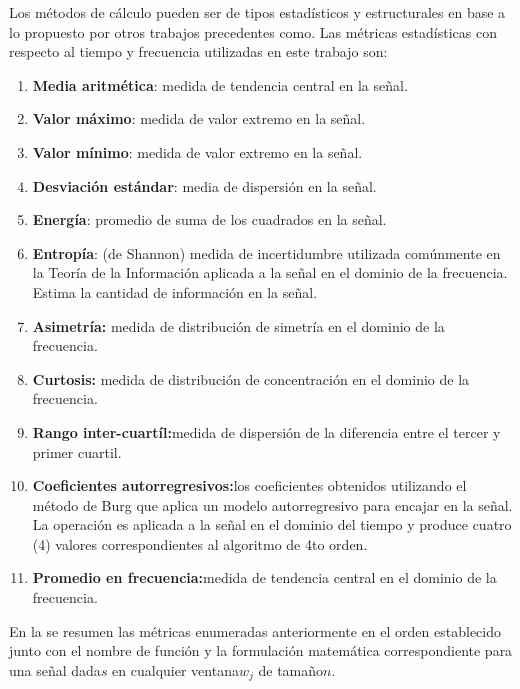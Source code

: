 Los métodos de cálculo pueden ser de tipos estadísticos y estructurales
\cite{LaraLabrador2013} en base a lo propuesto por otros trabajos
precedentes como\cite{Yang2009,Bao2004}. Las métricas estadísticas
con respecto al tiempo y frecuencia utilizadas en este trabajo son:
\begin{enumerate}
\item \textbf{Media aritmética}: medida de tendencia central en la señal.
\item \textbf{Valor máximo}: medida de valor extremo en la señal.
\item \textbf{Valor mínimo}: medida de valor extremo en la señal.
\item \textbf{Desviación estándar}: media de dispersión en la señal.
\item \textbf{Energía}: promedio de suma de los cuadrados en la señal.
\item \textbf{Entropía}: (de Shannon) medida de incertidumbre utilizada
comúnmente en la Teoría de la Información aplicada a la señal en el
dominio de la frecuencia. Estima la cantidad de información en la
señal.
\item \textbf{Asimetría:} medida de distribución de simetría en el dominio
de la frecuencia.
\item \textbf{Curtosis:} medida de distribución de concentración en el dominio
de la frecuencia.
\item \textbf{Rango inter-cuartíl:}medida de dispersión de la diferencia
entre el tercer y primer cuartil.
\item \textbf{Coeficientes autorregresivos:}los coeficientes obtenidos utilizando
el método de Burg que aplica un modelo autorregresivo para encajar
en la señal. La operación es aplicada a la señal en el dominio del
tiempo y produce cuatro (4) valores correspondientes al algoritmo
de 4to orden.
\item \textbf{Promedio en frecuencia:}medida de tendencia central en el
dominio de la frecuencia.
\end{enumerate}
En la se resumen las métricas enumeradas anteriormente
en el orden establecido junto con el nombre de función y la formulación
matemática correspondiente para una señal dada$s$ en cualquier ventana$w_{j}$
de tamaño$n$.

